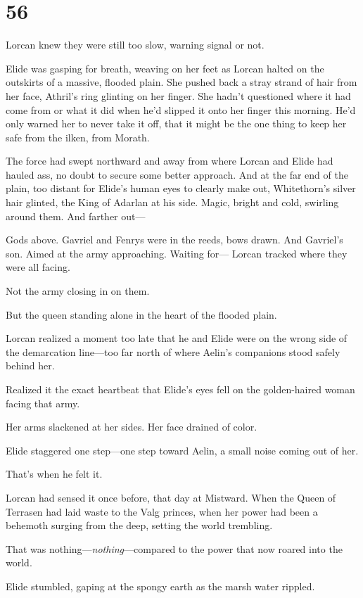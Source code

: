 
\chapter{56}

Lorcan knew they were still too slow, warning signal or not.

Elide was gasping for breath, weaving on her feet as Lorcan halted on the outskirts of a massive, flooded plain.
She pushed back a stray strand of hair from her face, Athril's ring glinting on her finger.
She hadn't questioned where it had come from or what it did when he'd slipped it onto her finger this morning.
He'd only warned her to never take it off, that it might be the one thing to keep her safe from the ilken, from Morath.

The force had swept northward and away from where Lorcan and Elide had hauled ass, no doubt to secure some better approach.
And at the far end of the plain, too distant for Elide's human eyes to clearly make out, Whitethorn's silver hair glinted, the King of Adarlan at his side.
Magic, bright and cold, swirling around them.
And farther out---

Gods above.
Gavriel and Fenrys were in the reeds, bows drawn.
And Gavriel's son.
Aimed at the army approaching.
Waiting for--- Lorcan tracked where they were all facing.

Not the army closing in on them.

But the queen standing alone in the heart of the flooded plain.

Lorcan realized a moment too late that he and Elide were on the wrong side of the demarcation line---too far north of where Aelin's companions stood safely behind her.

Realized it the exact heartbeat that Elide's eyes fell on the golden-haired woman facing that army.

Her arms slackened at her sides.
Her face drained of color.

Elide staggered one step---one step toward Aelin, a small noise coming out of her.

That's when he felt it.

Lorcan had sensed it once before, that day at Mistward.
When the Queen of Terrasen had laid waste to the Valg princes, when her power had been a behemoth surging from the deep, setting the world trembling.

That was nothing---\emph{nothing}---compared to the power that now roared into the world.

Elide stumbled, gaping at the spongy earth as the marsh water rippled.


